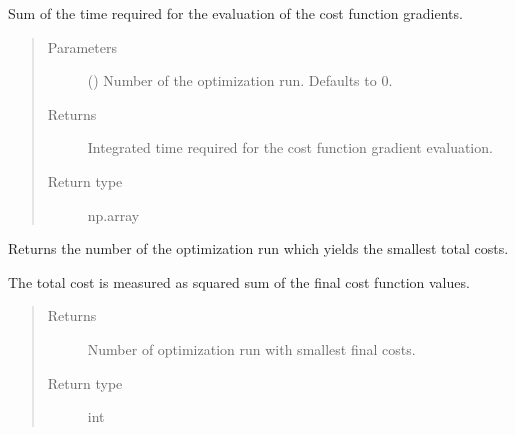 \documentclass[letterpaper,10pt,english]{sphinxmanual}
\begin{document}
\begin{fulllineitems}
\begin{fulllineitems}
\label{\detokenize{qsim:qsim.analyser.Analyser.integral_grad_fkt_times}}
Sum of the time required for the evaluation of the cost
function gradients.
\begin{quote}\begin{description}
\item[{Parameters}] \leavevmode
{} (\sphinxstyleliteralemphasis{\sphinxupquote{, }}) \textendash{} Number of the optimization run. Defaults to 0.

\item[{Returns}] \leavevmode
{} \textendash{} Integrated time required for the cost function gradient evaluation.

\item[{Return type}] \leavevmode
np.array

\end{description}\end{quote}

\end{fulllineitems}


\begin{fulllineitems}
\label{\detokenize{qsim:qsim.analyser.Analyser.n_least_square}}
Returns the number of the optimization run which yields the smallest
total costs.

The total cost is measured as squared sum of the final cost function
values.
\begin{quote}\begin{description}
\item[{Returns}] \leavevmode
{} \textendash{} Number of optimization run with smallest final costs.

\item[{Return type}] \leavevmode
int

\end{description}\end{quote}


\end{fulllineitems}
\end{fulllineitems}
\end{document}
